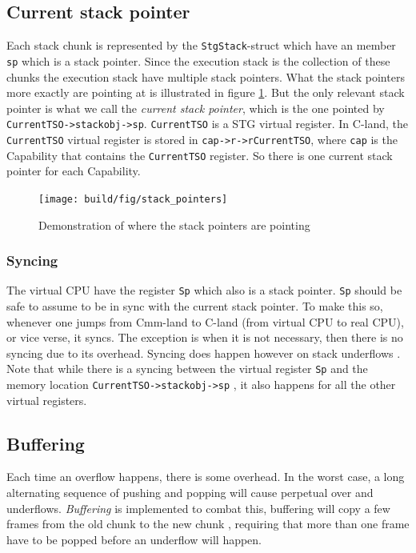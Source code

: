\subsection{Current stack pointer}

Each stack chunk is represented by the \texttt{StgStack}-struct
which have an member \texttt{sp} which is a stack pointer.
Since the execution stack is the collection of these chunks the
execution stack have multiple stack pointers. What the stack
pointers more exactly are pointing at is illustrated in figure
\ref{fig:stack_pointers}. But the only relevant stack pointer is what
we call the \emph{current stack pointer}, which is the one pointed by
\texttt{CurrentTSO->stackobj->sp}. \texttt{CurrentTSO} is a STG virtual
register. In C-land, the \texttt{CurrentTSO} virtual register is stored
in \texttt{cap->r->rCurrentTSO}, where \texttt{cap} is the Capability
that contains the \texttt{CurrentTSO} register. So there is one current
stack pointer for each Capability.

\begin{figure}
\begin{mdframed}
  \texttt{[image: build/fig/stack\_pointers]}
  \caption{Demonstration of where the stack pointers are pointing}
  \label{fig:stack_pointers}
\end{mdframed}
\end{figure}

\subsubsection{Syncing}

The virtual CPU have the register \texttt{Sp} which also is a stack
pointer. \texttt{Sp} should be safe to assume to be in sync with
the current stack pointer. To make this so, whenever one jumps
from Cmm-land to C-land (from virtual CPU to real CPU), or vice
verse, it syncs. The exception is when it is not necessary, then there
is no syncing due to its overhead. Syncing does happen however on stack
underflows \cite{github_underflow_frame}. Note that while there is a
syncing between the virtual register \texttt{Sp} and the memory location
\texttt{CurrentTSO->stackobj->sp} \cite{github_sync_sp}, it also happens
for all the other virtual registers.

\subsection{Buffering}

Each time an overflow happens, there is some overhead. In the worst
case, a long alternating sequence of pushing and popping will cause
perpetual over and underflows. \emph{Buffering} is implemented to combat this,
buffering will copy a few frames from the old chunk to the new chunk
\cite{github_stack_buffering}, requiring that more than one frame have
to be popped before an underflow will happen.

